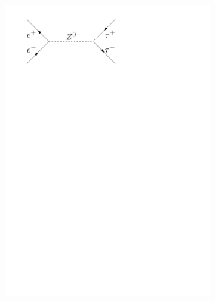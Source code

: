 \documentclass[11pt, a4paper]{article}
\numberwithin{equation}{section}
\begin{document}
\begin{figure}[htb]
\begin{subfigure}{.32\textwidth}
		\includegraphics[width=.9\textwidth]{./figures/theory/feynman/tt}
	\end{subfigure}
	\begin{subfigure}{.32\textwidth}
		\centering

\end{subfigure}
\end{figure}
\end{document}
